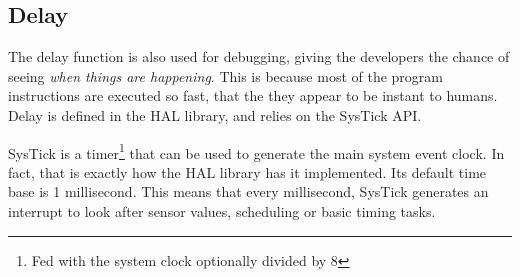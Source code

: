 \subsection{Delay}
\label{ssec:delay}
The delay function is also used for debugging, giving the developers the 
chance of seeing \textit{when things are happening}. This is because most of the
program instructions are executed so fast, that the they appear to be
instant to humans. 
Delay is defined in the HAL library, and relies on the SysTick API.

SysTick is a timer\footnote{Fed with the system clock optionally 
divided by 8} that can 
be used to generate the main system event clock.
In fact, that is exactly how the HAL library has it implemented. Its
default time base is 1 millisecond. This means that every millisecond,
SysTick generates an interrupt to look after sensor values, scheduling or
basic timing tasks.

